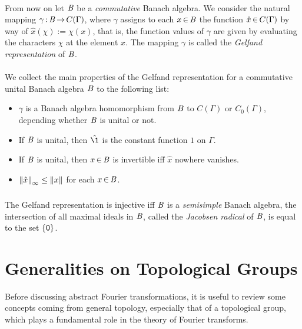 \documentclass[11pt,twoside]{article}
\begin{document}
\paragraph{} %
From now on
let $\mathit{B}$ be a \textit{commutative} Banach algebra.
We consider the natural mapping $\gamma {\,:\,}\mathit{B} {\,\to\,} C(\Gamma)$,
where $\gamma$ assigns to each $x {\,\in\,} \mathit{B}$ the function
$\hat{x} {\,\in\,} C(\Gamma)$ by way of $\hat{x}(\chi) := \chi(x)$,
that is,
the function values of $\gamma$ are given by evaluating
the characters $\chi$ at the element $x$.
The mapping $\gamma$ is called the \textit{Gelfand representation}
of $\mathit{B}$.

\paragraph{} %
We collect the main properties of the Gelfand representation
for a commutative unital Banach algebra $\mathit{B}$ to the following list:

\begin{itemize}[leftmargin=12mm]
\item[1.]
$\gamma$ is a Banach algebra homomorphism
from $\mathit{B}$ to $C(\Gamma)$ or $C_0(\Gamma)$,
depending whether $\mathit{B}$ is unital or not.

\item[2.]
If $\mathit{B}$ is unital,
then $\hat{\1}$ is the constant function $1$ on $\Gamma$.

\item[3.]
If $\mathit{B}$ is unital,
then $x {\,\in\,} \mathit{B}$ is invertible
iff $\hat{x}$ nowhere vanishes.

\item[4.]
$\left\lVert  \hat{x}  \right\rVert_{\infty} \leq \left\lVert x \right\rVert$ for each $x {\,\in\,} \mathit{B}$.
\end{itemize} 

\subparagraph{}
The Gelfand representation is injective
iff $\mathit{B}$ is a \textit{semisimple} Banach algebra,
{\ie} the intersection of all maximal ideals in $\mathit{B}$,
called the \textit{Jacobsen radical} of $\mathit{B}$,
is equal to the set $\{{\mathsf{0}}\}$.

\section{Generalities on Topological Groups}
Before discussing abstract Fourier transformations,
it is useful to review some concepts coming from general topology,
especially that of a topological group, 
which plays a fundamental role in the theory of Fourier transforms.
\end{document}
